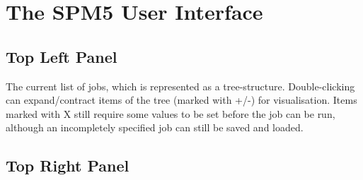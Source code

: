 \documentclass[a4paper,titlepage]{book}
\begin{document}
\newlength{\centeroffset}
\setlength{\centeroffset}{-0.5\oddsidemargin}
\addtolength{\centeroffset}{0.5\evensidemargin}
\thispagestyle{empty}
\noindent\hspace*{\centeroffset}

\noindent\hspace*{\centeroffset}

\dominitoc\tableofcontents

\newpage


\section*{The SPM5 User Interface}


\subsection*{Top Left Panel}

The current list of jobs, which is represented as a tree-structure. Double-clicking can expand/contract items of the tree (marked with +/-) for visualisation. Items marked with X still require some values to be set before the job can be run, although an incompletely specified job can still be saved and loaded.


\subsection*{Top Right Panel}
\end{document}
